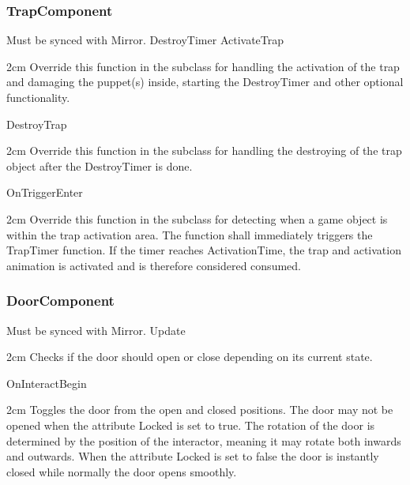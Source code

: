 \documentclass[11pt]{article}
\newenvironment{indentall}{\begin{adjustwidth}{2cm}{}}{\end{adjustwidth}}
\begin{document}
\subsubsection{TrapComponent}
Must be synced with Mirror.
\newline
\newline DestroyTimer
\newline
\newline ActivateTrap
\begin{indentall}
Override this function in the subclass for handling the activation of the trap and damaging the puppet(s) inside, starting the DestroyTimer and other optional functionality.
\end{indentall}
DestroyTrap
\begin{indentall}
Override this function in the subclass for handling the destroying of the trap object after the DestroyTimer is done.
\end{indentall}
OnTriggerEnter
\begin{indentall}
Override this function in the subclass for detecting when a game object is within the trap activation area. The function shall immediately triggers the TrapTimer function. If the timer reaches ActivationTime, the trap and activation animation is activated and is therefore considered consumed.
\end{indentall}

\subsubsection{DoorComponent}
Must be synced with Mirror.
\newline
\newline Update
\begin{indentall}
Checks if the door should open or close depending on its current state.
\end{indentall}
OnInteractBegin
\begin{indentall}
Toggles the door from the open and closed positions. The door may not be opened when the attribute Locked is set to true. The rotation of the door is determined by the position of the interactor, meaning it may rotate both inwards and outwards. When the attribute Locked is set to false the door is instantly closed while normally the door opens smoothly.
\end{indentall}
\end{document}
